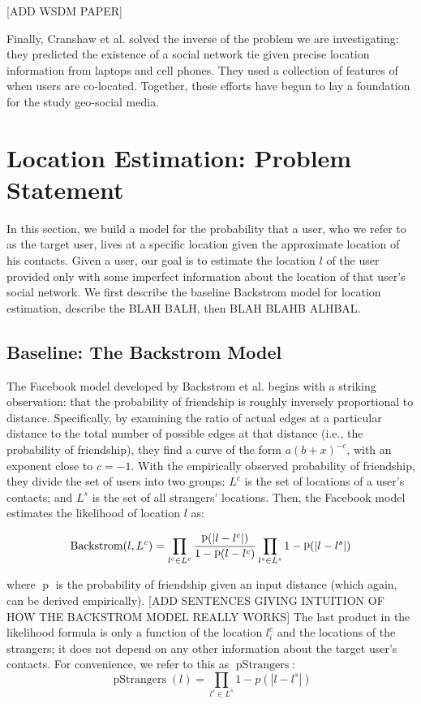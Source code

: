 \documentclass[letterpaper]{article}
\DeclareMathOperator{\pStrangers}{pStrangers}
\DeclareMathOperator{\Backstrom}{Backstrom}
\DeclareMathOperator{\p}{p}
\begin{document}
[ADD WSDM PAPER] 

Finally, Cranshaw et al. \cite{cranshaw2010bridging} solved the inverse of the problem we are investigating: they predicted the existence of a social network tie given precise location information from laptops and cell phones. They used a collection of features of when users are co-located.  Together, these efforts have begun to lay a foundation for the study geo-social media.









\section{Location Estimation: Problem Statement}
In this section, we build a model for the probability that a user, who we refer to as the target user, lives at a specific location given the approximate location of his contacts. Given a user, our goal is to estimate the location $l$ of the user provided only with some imperfect information about the location of that user's social network.  We first describe the baseline Backstrom model for location estimation, describe the BLAH BALH, then BLAH BLAHB ALHBAL.

\subsection{Baseline: The Backstrom Model}
The Facebook model developed by Backstrom et al. \cite{backstrom2010find} begins with a striking observation: that the probability of friendship is roughly inversely proportional to distance. Specifically, by examining the ratio of actual edges at a particular distance to the total number of possible edges at that distance (i.e., the probability of friendship), they find a curve of the form $a(b+x)^{-c}$, with an exponent close to $c=-1$. With the empirically observed probability of friendship, they divide the set of users into two groups: $L^c$ is the set of locations of a user's contacts; and $L^s$ is the set of all strangers' locations. Then, the Facebook model estimates the likelihood of location $l$ as: 

\[
    \Backstrom(l,L^c) = 
        \prod_{l^c \in L^c} {\p(|l-l^c|) \over 1-\p(l-l^c) }
        \prod_{l^s \in L^s} 1-\p(|l-l^s|)
\]

\noindent where $\p$ is the probability of friendship given an input distance (which again, can be derived empirically). [ADD SENTENCES GIVING INTUITION OF HOW THE BACKSTROM MODEL REALLY WORKS] The last product in the likelihood formula is only a function of the location $l^c_i$ and the locations of the strangers; it does not depend on any other information about the target user's contacts. For convenience, we refer to this as $\pStrangers$:
\[
    \pStrangers(l) = \prod_{l^s \in L^s}1-p(|l-l^s|)
\]
\end{document}
